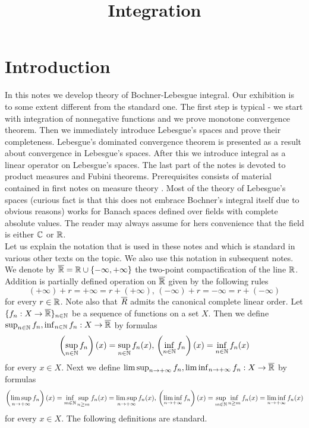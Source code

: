 



\title{Integration}
\date{}
\maketitle

\section{Introduction}
In this notes we develop theory of Bochner-Lebesgue integral. Our exhibition is to some extent different from the standard one. The first step is typical - we start with integration of nonnegative functions and we prove monotone convergence theorem. Then we immediately introduce Lebesgue's spaces and prove their completeness. Lebesgue's dominated convergence theorem is presented as a result about convergence in Lebesgue's spaces. After this we introduce integral as a linear operator on Lebesgue's spaces. The last part of the notes is devoted to product measures and Fubini theorems. Prerequisites consists of material contained in first notes on measure theory \cite{Introduction_to_measure_theory}. Most of the theory of Lebesgue's spaces (curious fact is that this does not embrace Bochner's integral itself due to obvious reasons) works for Banach spaces defined over fields with complete absolute values. The reader may always assume for hers convenience that the field is either ${\mathbb C}$ or ${\mathbb R}$.\\
Let us explain the notation that is used in these notes and which is standard in various other texts on the topic. We also use this notation in subsequent notes. We denote by $\overline{{\mathbb R}}={\mathbb R}\cup \{-\infty,+\infty\}$ the two-point compactification of the line ${\mathbb R}$. Addition is partially defined operation on $\overline{{\mathbb R}}$ given by the following rules
$$(+\infty)+r=+\infty=r+(+\infty),\,(-\infty)+r=-\infty=r+(-\infty)$$
for every $r\in {\mathbb R}$. Note also that $\overline{R}$ admits the canonical complete linear order. Let $\{f_n:X\rightarrow \overline{{\mathbb R}}\}_{n\in {\mathbb N}}$ be a sequence of functions on a set $X$. Then we define $\sup_{n\in {\mathbb N}}f_n,\inf_{n\in {\mathbb N}}f_n:X\rightarrow \overline{{\mathbb R}}$ by formulas
$$\left(\sup_{n\in {\mathbb N}}f_n\right)(x) = \sup_{n\in {\mathbb N}}f_n(x),\,\left(\inf_{n\in {\mathbb N}}f_n\right)(x) = \inf_{n\in {\mathbb N}}f_n(x)$$
for every $x\in X$. Next we define $\limsup_{n\rightarrow +\infty}f_n,\liminf_{n\rightarrow +\infty}f_n:X\rightarrow \overline{{\mathbb R}}$ by formulas
$$\left(\limsup_{n\rightarrow +\infty}f_n\right)(x) =\inf_{m\in {\mathbb N}}\sup_{n\geq m}f_n(x) = \limsup_{n\rightarrow +\infty}f_n(x),\,\left(\liminf_{n\rightarrow +\infty}f_n\right)(x) = \sup_{m\in {\mathbb N}}\inf_{n\geq m}f_n(x) = \liminf_{n\rightarrow +\infty}f_n(x)$$
for every $x\in X$. The following definitions are standard.

